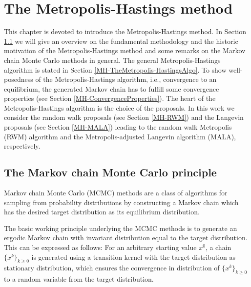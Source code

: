 \chapter{The Metropolis-Hastings method}
\label{sec:Metropolis-HastingsMethod}


This chapter is devoted to introduce the Metropolis-Hastings method. In Section \ref{MH-MCMCPrinciple} we will give an overview on the fundamental methodology and the historic motivation of the Metropolis-Hastings method and some remarks on the Markov chain Monte Carlo methods in general. The general Metropolis-Hastings algorithm is stated in Section \ref{MH-TheMetropolis-HastingsAlgo}. To show well-posedness of the Metropolis-Hastings algorithm, i.e., convergence to an equilibrium, the generated Markov chain has to fulfill some convergence properties (see Section \ref{MH-ConvergenceProperties}). The heart of the Metropolis-Hastings algorithm is the choice of the proposals. In this work we consider the random walk proposals (see Section \ref{MH-RWM}) and the Langevin proposals (see Section \ref{MH-MALA}) leading to the random walk Metropolis (RWM) algorithm and the Metropolis-adjusted Langevin algorithm (MALA), respectively.


\section{The Markov chain Monte Carlo principle}
\label{MH-MCMCPrinciple}

Markov chain Monte Carlo (MCMC) methods are a class of algorithms for sampling from probability distributions by constructing a Markov chain which has the desired target distribution as its equilibrium distribution.

The basic working principle underlying the MCMC methods is to generate an ergodic Markov chain with invariant distribution equal to the target distribution. This can be expressed as follows: For an arbitrary starting value $x^0$, a chain $ \{ x^{k} \}_{k \geq 0} $ is generated using a transition kernel with the target distribution as stationary distribution, which ensures the convergence in distribution of $ \{ x^{k} \}_{k \geq 0} $ to a random variable from the target distribution.


